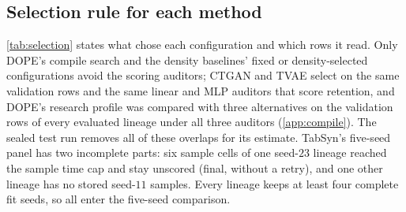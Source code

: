\documentclass{article}
\begin{document}


\begin{table}[t]
\caption{\textbf{Test-split provenance.} File-name counts only. No retention denominator and no Holm family.}
\label{tab:provenance}
\centering
\scriptsize
\setlength{\tabcolsep}{3pt}
\resizebox{\linewidth}{!}{\begin{minipage}{7.16in}\end{minipage}}
\end{table}

\subsection{Selection rule for each method}
\label{app:selection}
\cref{tab:selection} states what chose each configuration and which rows it read. Only DOPE's compile search and the density baselines' fixed or density-selected configurations avoid the scoring auditors; CTGAN and TVAE select on the same validation rows and the same linear and MLP auditors that score retention, and DOPE's research profile was compared with three alternatives on the validation rows of every evaluated lineage under all three auditors (\cref{app:compile}). The sealed test run removes all of these overlaps for its estimate. TabSyn's five-seed panel has two incomplete parts: six sample cells of one seed-$23$ lineage reached the sample time cap and stay unscored (final, without a retry), and one other lineage has no stored seed-$11$ samples. Every lineage keeps at least four complete fit seeds, so all enter the five-seed comparison.
\end{document}
